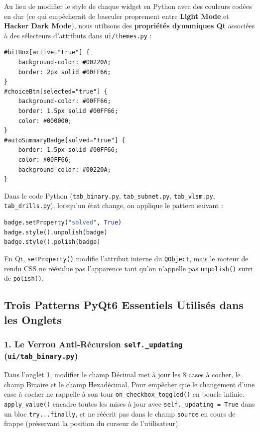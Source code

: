 \documentclass[11pt,a4paper]{article}
\begin{document}
Au lieu de modifier le style de chaque widget en Python avec des couleurs codées en dur (ce qui empêcherait de basculer proprement entre \textbf{Light Mode} et \textbf{Hacker Dark Mode}), nous utilisons des \textbf{propriétés dynamiques Qt} associées à des sélecteurs d'attributs dans \texttt{ui/themes.py} :
\begin{lstlisting}[caption={Extrait de ui/themes.py : Sélecteurs d'attributs QSS}]
#bitBox[active="true"] {
    background-color: #00220A;
    border: 2px solid #00FF66;
}
#choiceBtn[selected="true"] {
    background-color: #00FF66;
    border: 1.5px solid #00FF66;
    color: #000000;
}
#autoSummaryBadge[solved="true"] {
    border: 1.5px solid #00FF66;
    color: #00FF66;
    background-color: #00220A;
}
\end{lstlisting}

Dans le code Python (\texttt{tab\_binary.py}, \texttt{tab\_subnet.py}, \texttt{tab\_vlsm.py}, \texttt{tab\_drills.py}), lorsqu'un état change, on applique le pattern suivant :
\begin{lstlisting}[language=Python]
badge.setProperty("solved", True)
badge.style().unpolish(badge)
badge.style().polish(badge)
\end{lstlisting}
En Qt, \texttt{setProperty()} modifie l'attribut interne du \texttt{QObject}, mais le moteur de rendu CSS ne réévalue pas l'apparence tant qu'on n'appelle pas \texttt{unpolish()} suivi de \texttt{polish()}.

\subsection{Trois Patterns PyQt6 Essentiels Utilisés dans les Onglets}

\subsubsection{1. Le Verrou Anti-Récursion \texttt{self.\_updating} (\texttt{ui/tab\_binary.py})}
Dans l'onglet 1, modifier le champ Décimal met à jour les 8 cases à cocher, le champ Binaire et le champ Hexadécimal. Pour empêcher que le changement d'une case à cocher ne rappelle à son tour \texttt{on\_checkbox\_toggled()} en boucle infinie, \texttt{apply\_value()} encadre toutes les mises à jour avec \texttt{self.\_updating = True} dans un bloc \texttt{try...finally}, et ne réécrit pas dans le champ \texttt{source} en cours de frappe (préservant la position du curseur de l'utilisateur).
\end{document}
